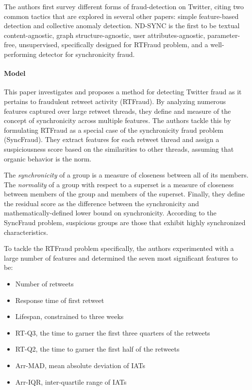 \documentclass[11pt, oneside]{article}   	%
\begin{document}
\quad The authors first survey different forms of fraud-detection on Twitter, citing two common tactics that are explored in several other papers: simple feature-based detection and collective anomaly detection.
ND-SYNC is the first to be textual content-agnostic, graph structure-agnostic, user attributes-agnostic, parameter-free, unsupervised, specifically designed for RTFraud problem, and a well-performing detector for synchronicity fraud.

\paragraph{Model}
\quad

\quad This paper investigates and proposes a method for detecting Twitter fraud as it pertains to fraudulent retweet activity (RTFraud).
By analyzing numerous features captured over large retweet threads, they define and measure of the concept of synchronicity across multiple features.
The authors tackle this by formulating RTFraud as a special case of the synchronicity fraud problem (SyncFraud).
They extract features for each retweet thread and assign a suspiciousness score based on the similarities to other threads, assuming that organic behavior is the norm.

\quad The \textit{synchronicity} of a group is a measure of closeness between all of its members.
The \textit{normality} of a group with respect to a superset is a measure of closeness between members of the group and members of the superset.
Finally, they define the residual score as the difference between the synchronicity and mathematically-defined lower bound on synchronicity.
According to the SyncFraud problem, suspicious groups are those that exhibit highly synchronized characteristics.

\quad To tackle the RTFraud problem specifically, the authors experimented with a large number of features and determined the seven most significant features to be:
\begin{itemize}
	\item Number of retweets
	\item Response time of first retweet
	\item Lifespan, constrained to three weeks
	\item RT-Q3, the time to garner the first three quarters of the retweets
	\item RT-Q2, the time to garner the first half of the retweets
	\item Arr-MAD, mean absolute deviation of IATs
	\item Arr-IQR, inter-quartile range of IATs
\end{itemize}
\end{document}
